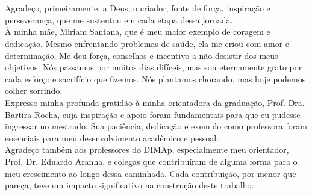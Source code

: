\chapter*{\agradecimentosnome}

Agradeço, primeiramente, a Deus, o criador, fonte de força, inspiração e perseverança, que me sustentou em cada etapa dessa jornada. \\

À minha mãe, Miriam Santana, que é meu maior exemplo de coragem e dedicação. Mesmo enfrentando problemas de saúde, ela me criou com amor e determinação. Me deu força, conselhos e incentivo a não desistir dos meus objetivos. Nós passamos por muitos dias difíceis, mas sou eternamente grato por cada esforço e sacrifício que fizemos. Nós plantamos chorando, mas hoje podemos colher sorrindo. \\

Expresso minha profunda gratidão à minha orientadora da graduação, Prof. Dra. Bartira Rocha, cuja inspiração e apoio foram fundamentais para que eu pudesse ingressar no mestrado. Sua paciência, dedicação e exemplo como professora foram essenciais para meu desenvolvimento acadêmico e pessoal. \\

Agradeço também aos professores do DIMAp, especialmente meu orientador, Prof. Dr. Eduardo Aranha, e colegas que contribuíram de alguma forma para o meu crescimento ao longo dessa caminhada. Cada contribuição, por menor que pareça, teve um impacto significativo na construção deste trabalho. \\

  \newpage